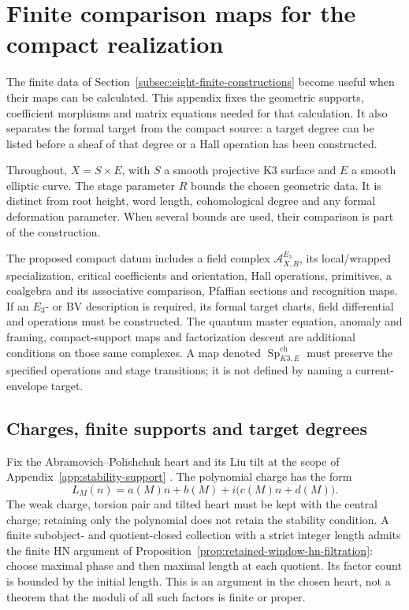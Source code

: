\section{Finite comparison maps for the compact realization}
\label{app:eight-finite-constructions}

The finite data of Section~\ref{subsec:eight-finite-constructions}
become useful when their maps can be calculated. This appendix fixes
the geometric supports, coefficient morphisms and matrix equations
needed for that calculation. It also separates the formal target
from the compact source: a target degree can be listed before a
sheaf of that degree or a Hall operation has been constructed.

Throughout, \(X=S\times E\), with \(S\) a smooth projective K3
surface and \(E\) a smooth elliptic curve. The stage parameter
\(R\) bounds the chosen geometric data. It is distinct from root
height, word length, cohomological degree and any formal deformation
parameter. When several bounds are used, their comparison is part
of the construction.

The proposed compact datum includes a field complex
\(\mathcal A_{X,R}^{E_3}\), its local/wrapped specialization,
critical coefficients and orientation, Hall operations, primitives,
a coalgebra and its associative comparison, Pfaffian sections and
recognition maps. If an \(E_3\)- or BV description is required,
its formal target charts, field differential and operations must be
constructed. The quantum master equation, anomaly and framing,
compact-support maps and factorization descent are additional
conditions on those same complexes. A map denoted
\(\operatorname{Sp}_{K3,E}^{\mathrm{ch}}\) must preserve the
specified operations and stage transitions; it is not defined by
naming a current-envelope target.

\subsection{Charges, finite supports and target degrees}
\label{app:build-charge-window}

Fix the Abramovich--Polishchuk heart and its Liu tilt at the scope
of Appendix~\ref{app:stability-support}
\cite{AbramovichPolishchukTStructures,LiuProductStability}.
The polynomial charge has the form
\[
 L_M(n)=a(M)n+b(M)+i\bigl(c(M)n+d(M)\bigr).
\]
The weak charge, torsion pair and tilted heart must be kept with
the central charge; retaining only the polynomial does not retain
the stability condition. A finite subobject- and quotient-closed
collection with a strict integer length admits the finite HN
argument of Proposition~\ref{prop:retained-window-hn-filtration}:
choose maximal phase and then maximal length at each quotient.
Its factor count is bounded by the initial length. This is an
argument in the chosen heart, not a theorem that the moduli of all
such factors is finite or proper.

